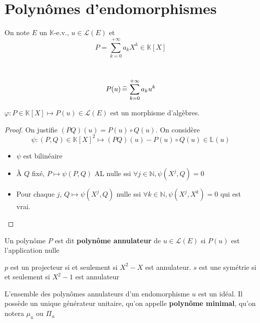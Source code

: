 \section{Polynômes d'endomorphismes}

\begin{defprop}
    \Hyp On note $E$ un $\mathbb K$-e.v., $u\in\mathcal L(E)$ et \[
        P=\sum_{k=0}^{+\infty}a_kX^k\in\mathbb K[X]
    \]
    \begin{concenum}
    \item ~ \[
            P(u)\,\widehat=\,\sum_{k=0}^{+\infty} a_ku^k
        \]
    \item $\varphi: P\in\mathbb K[X]\longmapsto P(u)\in\mathcal L(E)$ est un morphisme d'algèbres.
    \end{concenum}
\end{defprop}

\begin{proof}
    On justifie $(PQ)(u)=P(u)\circ Q(u)$. On considère \[
        \psi: (P, Q)\in\mathbb K[X]^2\longmapsto (PQ)(u)-P(u)\circ Q(u)\in\mathbb L(u)
    \]
    \begin{itemize}
        \item $\psi$ est bilinéaire
        \item À $Q$ fixé, $P\longmapsto \psi(P, Q)$ AL nulle ssi $\forall j\in\mathbb N, \psi(X^j, Q)=0$
        \item Pour chaque $j$, $Q\longmapsto \psi(X^j, Q)$ nulle ssi $\forall k\in\mathbb N, \psi(X^j, X^k)=0$ qui est vrai.
    \end{itemize}
\end{proof}

\begin{dfn}
    Un polynôme $P$ est dit \textbf{polynôme annulateur} de $u\in\mathcal L(E)$ si $P(u)$ est l'application nulle
\end{dfn}

\begin{ex}
    $p$ est un projecteur si et seulement si $X^2-X$ est annulateur. $s$ est une symétrie si et seulement si $X^2-1$ est annulateur
\end{ex}

\begin{defprop}
    L'ensemble des polynômes annulateurs d'un endomorphisme $u$ est un idéal. Il possède un unique générateur unitaire, qu'on appelle \textbf{polynôme minimal}, qu'on notera $\mu_u$ ou $\Pi_u$
\end{defprop}

